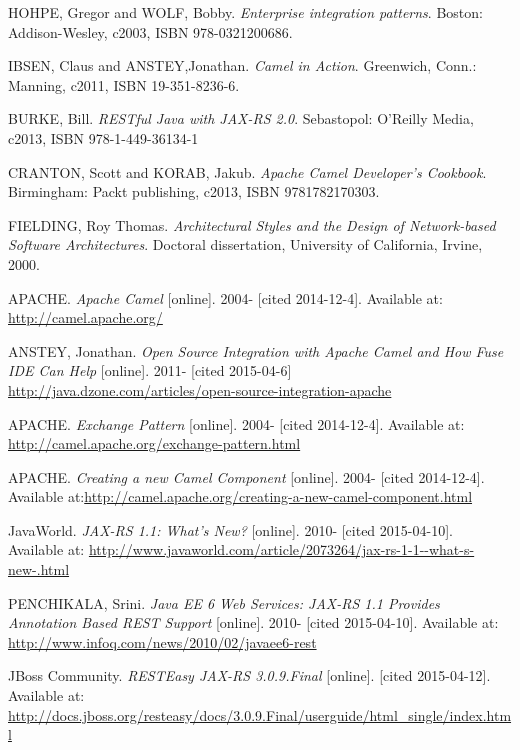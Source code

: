 \documentclass[12pt,final,oneside]{fithesis2}
\begin{document}
\begin{thebibliography}{}


 HOHPE, Gregor and WOLF, Bobby. \textit{Enterprise integration patterns}. Boston: Addison-Wesley, c2003, ISBN 978-0321200686.

 IBSEN, Claus and ANSTEY,Jonathan. \textit{Camel in Action}. Greenwich, Conn.: Manning, c2011, ISBN 19-351-8236-6.

 BURKE, Bill. \textit{RESTful Java with JAX-RS 2.0}. Sebastopol: O'Reilly Media, c2013, ISBN 978-1-449-36134-1

 CRANTON, Scott and KORAB, Jakub. \textit{Apache Camel Developer's Cookbook}.  Birmingham: Packt publishing, c2013, ISBN 9781782170303.

 FIELDING, Roy Thomas. \textit{Architectural Styles and the Design of Network-based Software Architectures}. Doctoral dissertation, University of California, Irvine, 2000. 

 APACHE. \textit{Apache Camel} [online]. 2004- [cited 2014-12-4]. Available at: \url{http://camel.apache.org/}

 ANSTEY, Jonathan. \textit{Open Source Integration with Apache Camel and How Fuse IDE Can Help} [online]. 2011- [cited 2015-04-6] \url{http://java.dzone.com/articles/open-source-integration-apache}

 APACHE. \textit{Exchange Pattern} [online]. 2004- [cited 2014-12-4]. Available at: \url{http://camel.apache.org/exchange-pattern.html}

  APACHE. \textit{Creating a new Camel Component} [online]. 2004- [cited 2014-12-4]. Available at:\url{http://camel.apache.org/creating-a-new-camel-component.html}




 JavaWorld. \textit{JAX-RS 1.1: What's New?} [online]. 2010- [cited 2015-04-10]. Available at: \url{http://www.javaworld.com/article/2073264/jax-rs-1-1--what-s-new-.html}


  PENCHIKALA, Srini. \textit{
Java EE 6 Web Services: JAX-RS 1.1 Provides Annotation Based REST Support} [online]. 2010- [cited 2015-04-10]. Available at: \url{http://www.infoq.com/news/2010/02/javaee6-rest}

 JBoss Community. \textit{RESTEasy JAX-RS 3.0.9.Final} [online]. [cited 2015-04-12]. Available at: \url{http://docs.jboss.org/resteasy/docs/3.0.9.Final/userguide/html_single/index.html}


\end{thebibliography}
\end{document}
